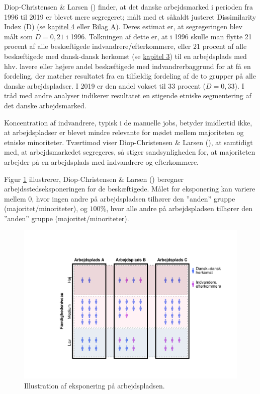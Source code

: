 \documentclass[
]{book}
\begin{document}
Diop-Christensen \& Larsen () finder, at det danske arbejdsmarked i perioden fra 1996 til 2019 er blevet mere segregeret; målt med et såkaldt justeret Dissimilarity Index (D) (se \hyperref[kap4]{kapitel 4} eller \hyperref[bilagA]{Bilag A}). Deres estimat er, at segregeringen blev målt som \(D=0,21\) i 1996. Tolkningen af dette er, at i 1996 skulle man flytte 21 procent af alle beskæftigede indvandrere/efterkommere, eller 21 procent af alle beskæftigede med dansk-dansk herkomst (se \hyperref[kap3]{kapitel 3}) til en arbejdsplads med hhv. lavere eller højere andel beskæftigede med indvandrerbaggrund for at få en fordeling, der matcher resultatet fra en tilfældig fordeling af de to grupper på alle danske arbejdspladser. I 2019 er den andel vokset til 33 procent (\(D=0,33\)). I tråd med andre analyser indikerer resultatet en stigende etniske segmentering af det danske arbejdsmarked.

Koncentration af indvandrere, typisk i de manuelle jobs, betyder imidlertid ikke, at arbejdspladser er blevet mindre relevante for mødet mellem majoriteten og etniske minoriteter. Tværtimod viser Diop-Christensen \& Larsen (), at samtidigt med, at arbejdsmarkedet segregeres, så stiger sandsynligheden for, at majoriteten arbejder på en arbejdsplads med indvandrere og efterkommere.

Figur \ref{fig:fig-5-1} illustrerer, Diop-Christensen \& Larsen () beregner arbejdsstedseksponeringen for de beskæftigede. Målet for eksponering kan variere mellem \(0\), hvor ingen andre på arbejdspladsen tilhører den ''anden'' gruppe (majoritet/minoriteter), og \(100\%\), hvor alle andre på arbejdspladsen tilhører den ''anden'' gruppe (majoritet/minoriteter).

\begin{figure}
\includegraphics[width=1\linewidth]{en-befolkning-blander-sig_files/figure-latex/fig-5-1-1} \caption{Illustration af eksponering på arbejdspladsen.}\label{fig:fig-5-1}
\end{figure}
\end{document}
